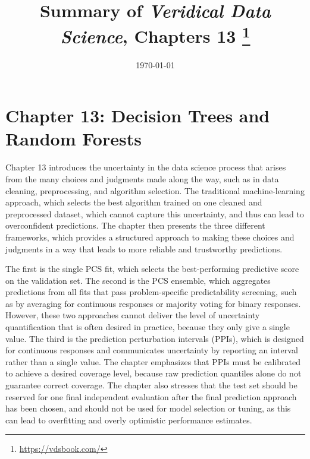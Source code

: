 \documentclass[letterpaper, 11pt]{article}
\title{\vspace{-1.5cm} Summary of \textit{Veridical Data Science}, Chapters 13 \footnote{\url{https://vdsbook.com/}}}
\date{\today}
\begin{document}
\hypersetup{colorlinks=true, linkcolor=blue, urlcolor=blue}
\maketitle

\section*{Chapter 13: Decision Trees and Random Forests}
Chapter 13 introduces the uncertainty in the data science process that arises from the many choices and judgments made along the way, such as in data cleaning, preprocessing, and algorithm selection.
The traditional machine-learning approach, which selects the best algorithm trained on one cleaned and preprocessed dataset, which cannot capture this uncertainty, and thus can lead to overconfident predictions.
The chapter then presents the three different frameworks, which provides a structured approach to making these choices and judgments in a way that leads to more reliable and trustworthy predictions.

The first is the single PCS fit, which selects the best-performing predictive score on the validation set.
The second is the PCS ensemble, which aggregates predictions from all fits that pass problem-specific predictability screening, such as by averaging for continuous responses or majority voting for binary responses.
However, these two approaches cannot deliver the level of uncertainty quantification that is often desired in practice, because they only give a single value.
The third is the prediction perturbation intervals (PPIs), which is designed for continuous responses and communicates uncertainty by reporting an interval rather than a single value.
The chapter emphasizes that PPIs must be calibrated to achieve a desired coverage level, because raw prediction quantiles alone do not guarantee correct coverage.
The chapter also stresses that the test set should be reserved for one final independent evaluation after the final prediction approach has been chosen, and should not be used for model selection or tuning, as this can lead to overfitting and overly optimistic performance estimates.

\end{document}

